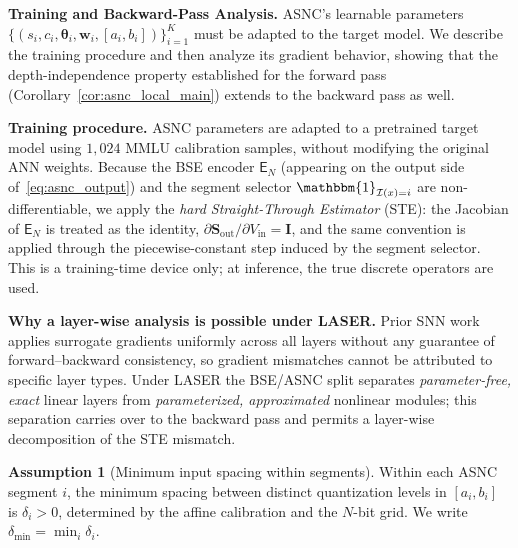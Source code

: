 \documentclass{article}
\theoremstyle{plain}
\theoremstyle{definition}
\newtheorem{assumption}[theorem]{Assumption}
\theoremstyle{remark}
\begin{document}
\noindent\textbf{Training and Backward-Pass Analysis.}
\label{subsubsec:asnc_training}
ASNC's learnable parameters
$\{(s_i,c_i,\boldsymbol{\theta}_i,\mathbf{w}_i,[a_i,b_i])\}_{i=1}^{K}$ must
be adapted to the target model. We describe the training procedure and then
analyze its gradient behavior, showing that the depth-independence property
established for the forward pass (Corollary~\ref{cor:asnc_local_main})
extends to the backward pass as well.

\noindent\textbf{Training procedure.}
ASNC parameters are adapted to a pretrained target model using $1{,}024$
MMLU calibration samples, without modifying the original ANN weights.
Because the BSE encoder $\mathsf{E}_N$ (appearing on the output side
of~\eqref{eq:asnc_output}) and the segment selector
$\mathbbm{1}_{\mathcal{I}(x)=i}$ are non-differentiable, we apply the
\emph{hard Straight-Through Estimator} (STE): the Jacobian of $\mathsf{E}_N$
is treated as the identity,
$\partial \mathbf{S}_{\mathrm{out}}/\partial V_{\mathrm{in}}=\mathbf{I}$,
and the same convention is applied through the piecewise-constant step
induced by the segment selector. This is a training-time device only;
at inference, the true discrete operators are used.

\noindent\textbf{Why a layer-wise analysis is possible under LASER.}
Prior SNN work applies surrogate gradients uniformly across all layers
without any guarantee of forward--backward consistency, so gradient
mismatches cannot be attributed to specific layer types. Under LASER the
BSE/ASNC split separates \emph{parameter-free, exact} linear layers from
\emph{parameterized, approximated} nonlinear modules; this separation
carries over to the backward pass and permits a layer-wise decomposition
of the STE mismatch.

\begin{assumption}[Minimum input spacing within segments]
\label{asm:input_spacing}
Within each ASNC segment $i$, the minimum spacing between distinct
quantization levels in $[a_i,b_i]$ is $\delta_i>0$, determined by the
affine calibration and the $N$-bit grid. We write
$\delta_{\min}=\min_i\delta_i$.
\end{assumption}
\end{document}
